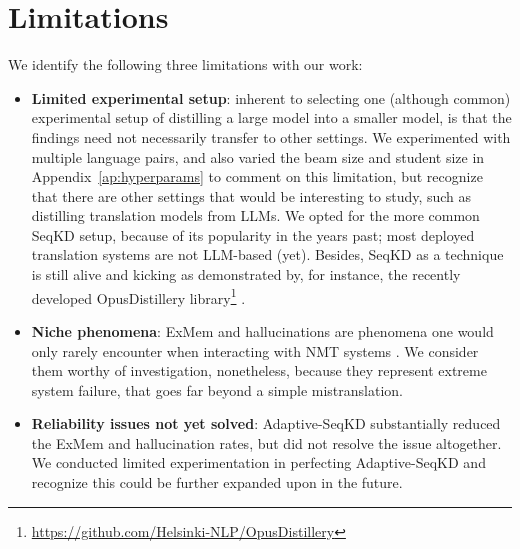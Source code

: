 \section{Limitations}
We identify the following three limitations with our work:
\begin{itemize}[]
    \item \textbf{Limited experimental setup}: inherent to selecting one (although common) experimental setup of distilling a large model into a smaller model, is that the findings need not necessarily transfer to other settings. We experimented with multiple language pairs, and also varied the beam size and student size in Appendix~\ref{ap:hyperparams} to comment on this limitation, but recognize that there are other settings that would be interesting to study, such as distilling translation models from LLMs. We opted for the more common SeqKD setup, because of its popularity in the years past; most deployed translation systems are not LLM-based (yet). Besides, SeqKD as a technique is still alive and kicking as demonstrated by, for instance, the recently developed OpusDistillery library\footnote{\url{https://github.com/Helsinki-NLP/OpusDistillery}} \citep{arefyev2024hplt}.
    \item \textbf{Niche phenomena}: ExMem and hallucinations are phenomena one would only rarely encounter when interacting with NMT systems \cite{raunak-etal-2022-salted}. We consider them worthy of investigation, nonetheless, because they represent extreme system failure, that goes far beyond a simple mistranslation. 
    \item \textbf{Reliability issues not yet solved}: Adaptive-SeqKD substantially reduced the ExMem and hallucination rates, but did not resolve the issue altogether. We conducted limited experimentation in perfecting Adaptive-SeqKD and recognize this could be further expanded upon in the future. 
\end{itemize}